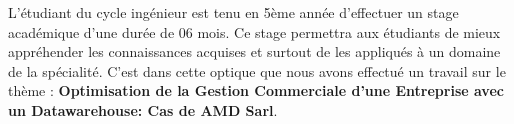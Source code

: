 	\par L’étudiant du cycle ingénieur est tenu en 5ème année d’effectuer un stage académique d'une durée de 06 mois. Ce stage permettra aux étudiants de mieux appréhender les connaissances acquises et surtout de les appliqués à un domaine de la spécialité. C’est dans cette optique que nous avons effectué un travail sur le thème : \textbf{Optimisation de la Gestion Commerciale d'une Entreprise avec un Datawarehouse: Cas de AMD Sarl}.
